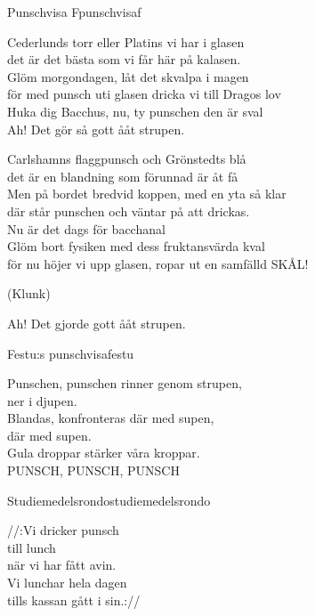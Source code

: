 \newpage

\begin{song}{Punschvisa F}{punschvisaf}
	\begin{vers}
		Cederlunds torr eller Platins vi har i glasen\\
		det är det bästa som vi får här på kalasen.\\
		Glöm morgondagen, låt det skvalpa i magen\\
		för med punsch uti glasen dricka vi till Dragos lov\\
		Huka dig Bacchus, nu, ty punschen den är sval\\
		Ah! Det gör så gott ååt strupen.
	\end{vers}
	\begin{vers}
		Carlshamns flaggpunsch och Grönstedts blå\\
		det är en blandning som förunnad är åt få \\
		Men på bordet bredvid koppen, med en yta så klar\\
		där står punschen och väntar på att drickas.\\
		Nu är det dags för bacchanal\\
		Glöm bort fysiken med dess fruktansvärda kval\\
		för nu höjer vi upp glasen, ropar ut en samfälld SKÅL!\\
	\end{vers}
	\begin{vers}
		(Klunk)
	\end{vers}
	\begin{vers}
		Ah! Det gjorde gott ååt strupen.
	\end{vers}
\end{song}

\newpage


\begin{song}{Festu:s punschvisa}{festu}
\begin{vers}
Punschen, punschen rinner genom strupen,\\
ner i djupen.\\
Blandas, konfronteras där med supen,\\
där med supen.\\
Gula droppar stärker våra kroppar.\\
PUNSCH, PUNSCH, PUNSCH\\
\end{vers}
\end{song}

\begin{song}{Studiemedelsrondo}{studiemedelsrondo}
\begin{vers}
//:Vi dricker punsch\\
till lunch\\
när vi har fått avin.\\
Vi lunchar hela dagen\\
tills kassan gått i sin.://\\
\end{vers}
\end{song}

